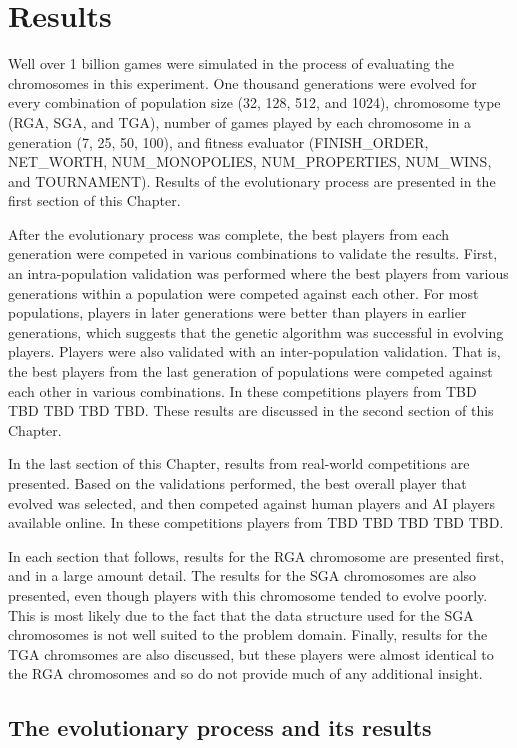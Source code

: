 \clearpage
\chapter{Results}\label{chap:results}

Well over 1 billion games were simulated in the process of evaluating the
chromosomes in this experiment. One thousand generations were evolved for every
combination of population size (32, 128, 512, and 1024), chromosome type (RGA,
SGA, and TGA), number of games played by each chromosome in a generation (7, 25,
50, 100), and fitness evaluator (FINISH\_ORDER, NET\_WORTH, NUM\_MONOPOLIES,
NUM\_PROPERTIES, NUM\_WINS, and TOURNAMENT). Results of the evolutionary process
are presented in the first section of this Chapter.

After the evolutionary process was complete, the best players from each
generation were competed in various combinations to validate the results. First,
an intra-population validation was performed where the best players from various
generations within a population were competed against each other. For most
populations, players in later generations were better than players in earlier
generations, which suggests that the genetic algorithm was successful in
evolving players. Players were also validated with an inter-population
validation. That is, the best players from the last generation of populations
were competed against each other in various combinations. In these competitions
players from TBD TBD TBD TBD TBD. These results are discussed in the second
section of this Chapter.

In the last section of this Chapter, results from real-world competitions are
presented. Based on the validations performed, the best overall player that
evolved was selected, and then competed against human players and AI players
available online. In these competitions players from TBD TBD TBD TBD TBD.

In each section that follows, results for the RGA chromosome are presented
first, and in a large amount detail. The results for the SGA chromosomes are
also presented, even though players with this chromosome tended to evolve
poorly. This is most likely due to the fact that the data structure used for the
SGA chromosomes is not well suited to the problem domain. Finally, results for
the TGA chromsomes are also discussed, but these players were almost identical
to the RGA chromosomes and so do not provide much of any additional insight.

\section{The evolutionary process and its results}

